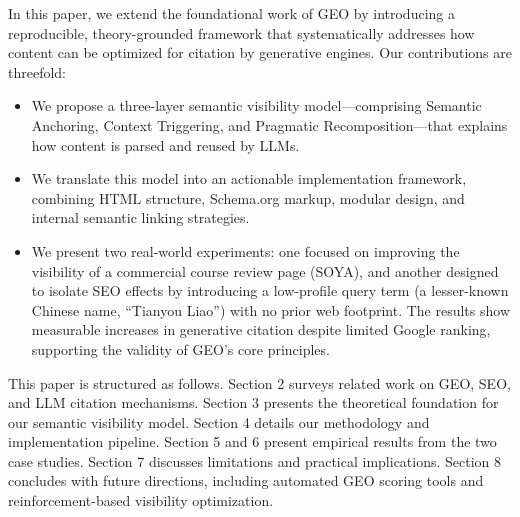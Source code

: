 In this paper, we extend the foundational work of GEO by introducing a reproducible, theory-grounded framework that systematically addresses how content can be optimized for citation by generative engines. Our contributions are threefold:
\begin{itemize}
  \item We propose a three-layer semantic visibility model—comprising Semantic Anchoring, Context Triggering, and Pragmatic Recomposition—that explains how content is parsed and reused by LLMs.
  \item We translate this model into an actionable implementation framework, combining HTML structure, Schema.org markup, modular design, and internal semantic linking strategies.
  \item We present two real-world experiments: one focused on improving the visibility of a commercial course review page (SOYA), and another designed to isolate SEO effects by introducing a low-profile query term (a lesser-known Chinese name, “Tianyou Liao”) with no prior web footprint. The results show measurable increases in generative citation despite limited Google ranking, supporting the validity of GEO’s core principles.
\end{itemize}

This paper is structured as follows. Section 2 surveys related work on GEO, SEO, and LLM citation mechanisms. Section 3 presents the theoretical foundation for our semantic visibility model. Section 4 details our methodology and implementation pipeline. Section 5 and 6 present empirical results from the two case studies. Section 7 discusses limitations and practical implications. Section 8 concludes with future directions, including automated GEO scoring tools and reinforcement-based visibility optimization.
